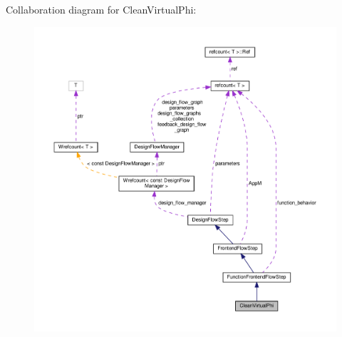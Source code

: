 Collaboration diagram for Clean\+Virtual\+Phi\+:
\nopagebreak
\begin{figure}[H]
\begin{center}
\leavevmode
\includegraphics[width=350pt]{dc/d64/classCleanVirtualPhi__coll__graph}
\end{center}
\end{figure}
